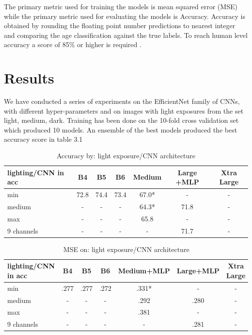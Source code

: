 \documentclass[10pt,letterpaper]{article}
\begin{document}
The primary metric used for training the models is mean squared error (MSE)
while the primary metric used for evaluating the models is Accuracy.
Accuracy is obtained by rounding the floating point number predictions
to nearest integer and comparing the age classification against the true labels.
To reach human level accuracy a score of 85\% or higher is required \citep{ref_needed}.

\section*{Results}

We have conducted a series of experiments on the EfficientNet family of CNNs, 
with different hyper-parameters and on images with light exposures 
from the set light, medium, dark.
Training has been done on the 10-fold cross validation set which produced 10 models.
An ensemble of the best models produced the best accuracy score in table 3.1

\begin{center}
\begin{table}[hbt!]
\caption{Accuracy by: light exposure/CNN architecture}
\begin{tabular}{ |l|c|c|c|c|c|c| }

\hline
lighting/CNN in acc & B4 & B5 & B6 & Medium & Large +MLP & Xtra Large \\ \hline
min & 72.8 & 74.4 & 73.4 & 67.0* & - & - \\ 
medium & - & - & - & 64.3* & 71.8 & - \\ 
max & - & - & - & 65.8 & - & - \\ 
9 channels & - & - & - & - & 71.7 & - \\ 
\hline
\end{tabular}
\end{table}
\end{center}

\begin{center}
\begin{table}[hbt!]
\caption{MSE on: light exposure/CNN architecture}
\begin{tabular}{ |l|c|c|c|c|c|c| }

\hline
lighting/CNN in acc & B4 & B5 & B6 & Medium+MLP & Large+MLP & Xtra Large \\ \hline
min & .277 & .277 & .272 & .331* & - & - \\ 
medium & - & - & - & .292 & .280 & - \\ 
max & - & - & - & .381 & - & - \\ 
9 channels & - & - & - & - & .281 & - \\ 
\hline
\end{tabular}
\end{table}
\end{center}
\end{document}
